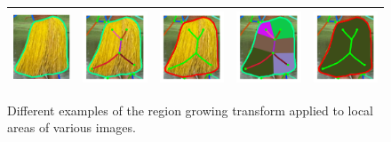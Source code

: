 \begin{figure}[pht]
\begin{tabular}{|c|c|c|c|c|}
\hline
\includegraphics[width=0.16\linewidth]{figs/101087_00_rc_cons.pdf} &
\includegraphics[width=0.16\linewidth]{figs/101087_00_rc_before_shocks.pdf} &
\includegraphics[width=0.16\linewidth]{figs/101087_00_rc_after_shocks.pdf} &
\includegraphics[width=0.16\linewidth]{figs/101087_00_rc_before_frags.pdf} &
\includegraphics[width=0.16\linewidth]{figs/101087_00_rc_after_frags.pdf}\\
\hline

\end{tabular}

\caption{Different examples of the region growing transform applied to local areas of various images.}
\label{fig:real_rc}
\end{figure}



